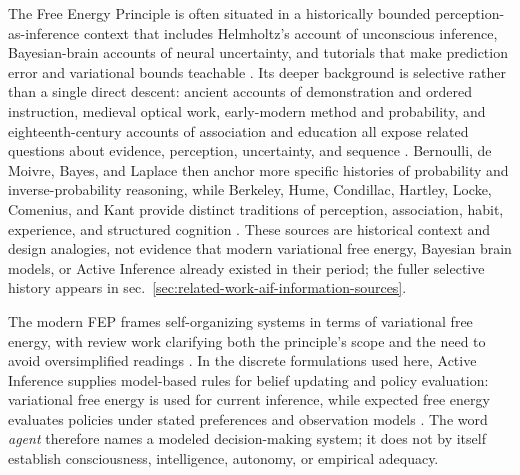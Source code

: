 \documentclass[
  english,
]{article}
\begin{document}
The Free Energy Principle is often situated in a historically bounded
perception-as-inference context that includes Helmholtz's account of
unconscious inference, Bayesian-brain accounts of neural uncertainty,
and tutorials that make prediction error and variational bounds
teachable
\citep{helmholtz1867handbuch, knill2004bayesian, bogacz2017tutorial, sprevak2023predictive}.
Its deeper background is selective rather than a single direct descent:
ancient accounts of demonstration and ordered instruction, medieval
optical work, early-modern method and probability, and
eighteenth-century accounts of association and education all expose
related questions about evidence, perception, uncertainty, and sequence
\citep{aristotle_posterior_analytics, alhazen1989optics_direct_vision, quintilian95institutio_oratoria, bacon1620novum_organum, descartes1628rules_direction_mind, huygens1657ratiociniis, newton1704opticks, rousseau1762emile}.
Bernoulli, de Moivre, Bayes, and Laplace then anchor more specific
histories of probability and inverse-probability reasoning, while
Berkeley, Hume, Condillac, Hartley, Locke, Comenius, and Kant provide
distinct traditions of perception, association, habit, experience, and
structured cognition
\citep{bernoulli1713ars_conjectandi, demoivre1718doctrine_chances, bayes1763doctrine_chances, laplace1774inverse_probability, berkeley1709new_theory_vision, hume1739treatise, condillac1754sensations, hartley1749observations, locke1690essay, comenius1657great_didactic, kant1781critique_pure_reason}.
These sources are historical context and design analogies, not evidence
that modern variational free energy, Bayesian brain models, or Active
Inference already existed in their period; the fuller selective history
appears in sec.~\ref{sec:related-work-aif-information-sources}.

The modern FEP frames self-organizing systems in terms of variational
free energy, with review work clarifying both the principle's scope and
the need to avoid oversimplified readings
\citep{friston2006free, friston2010free, friston2023simpler, zhang2024overview}.
In the discrete formulations used here, Active Inference supplies
model-based rules for belief updating and policy evaluation: variational
free energy is used for current inference, while expected free energy
evaluates policies under stated preferences and observation models
\citep{friston2017process, dacosta2020synthesis, parr2022active, pezzulo2024sentient_behavior}.
The word \emph{agent} therefore names a modeled decision-making system;
it does not by itself establish consciousness, intelligence, autonomy,
or empirical adequacy.
\end{document}
